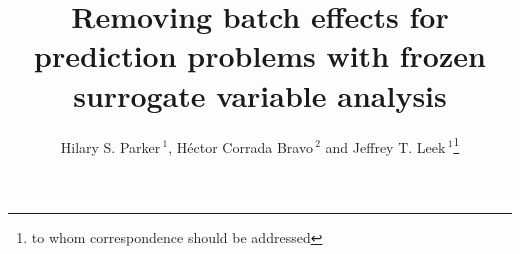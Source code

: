 \documentclass{bioinfo}\usepackage{graphicx, color}
\begin{document}

\title[Frozen Surrogate Variable Analysis]{Removing batch effects for prediction problems with frozen surrogate variable analysis}
\author[Parker \textit{et~al}]{Hilary S. Parker\,$^{1}$, H\'{e}ctor Corrada Bravo\,$^{2}$ and Jeffrey T. Leek\,$^1$\footnote{to whom correspondence should be addressed}}
\address{$^{1}$Department of Biostatistics, Johns Hopkins Bloomberg School of Public Health, Baltimore, MD, 21205\\
$^{2}$Center for Bioinformatics and Computational Biology, Department of Computer Science, University of Maryland, College Park, Maryland, 20742}



\maketitle
\end{document}
